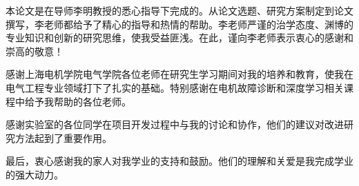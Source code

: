 \begin{acknowledgements}
	本论文是在导师李明教授的悉心指导下完成的。从论文选题、研究方案制定到论文撰写，李老师都给予了精心的指导和热情的帮助。李老师严谨的治学态度、渊博的专业知识和创新的研究思维，使我受益匪浅。在此，谨向李老师表示衷心的感谢和崇高的敬意！

	感谢上海电机学院电气学院各位老师在研究生学习期间对我的培养和教育，使我在电气工程专业领域打下了扎实的基础。特别感谢在电机故障诊断和深度学习相关课程中给予我帮助的各位老师。

	感谢实验室的各位同学在项目开发过程中与我的讨论和协作，他们的建议对改进研究方法起到了重要作用。

	最后，衷心感谢我的家人对我学业的支持和鼓励。他们的理解和关爱是我完成学业的强大动力。
\end{acknowledgements}